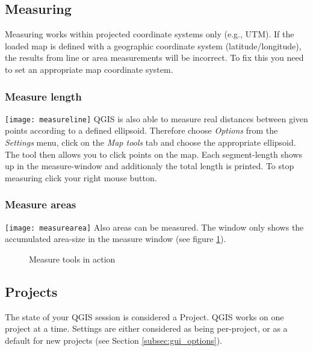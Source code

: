\subsection{Measuring}\label{sec:measure}

Measuring works within projected coordinate systems only (e.g., UTM). If 
the loaded map is defined with a geographic coordinate system
(latitude/longitude), the results from line or area measurements will be 
incorrect. To fix this you need to set an appropriate map coordinate system.

\subsubsection{Measure length}
\texttt{[image: measureline]} QGIS is also able to measure real distances between given 
points according to a defined ellipsoid. Therefore choose \textit{Options} from the \textit{Settings} menu, 
click on the \textit{Map tools} tab and choose the appropriate ellipsoid. The tool then allows you to 
click points on the map. Each segment-length shows up in the measure-window and additionaly the total 
length is printed. To stop measuring click your right mouse button. 

\subsubsection{Measure areas}
\texttt{[image: measurearea]} Also areas can be measured. The window only shows the
accumulated area-size in the measure window (see figure \ref{fig:measure}).

\begin{figure}[h]
\caption{Measure tools in action} \label{fig:measure}
\centering
   \goodgap
\end{figure}

\subsection{Projects}\label{sec:projects}

The state of your QGIS session is considered a Project.  QGIS
works on one project at a time.  Settings are either considered
as being per-project, or as a default for new projects (see
Section \ref{subsec:gui_options}).

